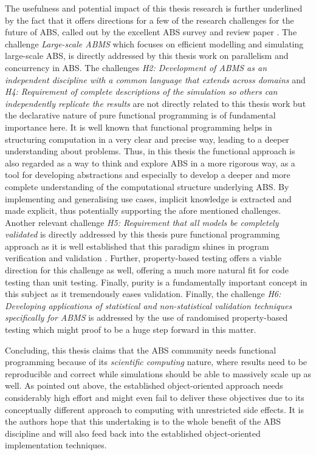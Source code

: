 The usefulness and potential impact of this thesis research is further underlined by the fact that it offers directions for a few of the research challenges for the future of ABS, called out by the excellent ABS survey and review paper \cite{macal_everything_2016}. The challenge \textit{Large-scale ABMS} which focuses on efficient modelling and simulating large-scale ABS, is directly addressed by this thesis work on parallelism and concurrency in ABS. The challenges \emph{H2: Development of ABMS as an independent discipline with a common language that extends across domains} and \emph{H4: Requirement of complete descriptions of the simulation so others can independently replicate the results} are not directly related to this thesis work but the declarative nature of pure functional programming is of fundamental importance here. It is well known that functional programming helps in structuring computation in a very clear and precise way, leading to a deeper understanding about problems. Thus, in this thesis the functional approach is also regarded as a way to think and explore ABS in a more rigorous way, as a tool for developing abstractions and especially to develop a deeper and more complete understanding of the computational structure underlying ABS. By implementing and generalising use cases, implicit knowledge is extracted and made explicit, thus potentially supporting the afore mentioned challenges. Another relevant challenge \emph{H5: Requirement that all models be completely validated} is directly addressed by this thesis pure functional programming approach as it is well established that this paradigm shines in program verification and validation \cite{hudak_history_2007, hutton_tutorial_1999}. Further, property-based testing offers a viable direction for this challenge as well, offering a much more natural fit for code testing than unit testing. Finally, purity is a fundamentally important concept in this subject as it tremendously eases validation. Finally, the challenge \emph{H6: Developing applications of statistical and non-statistical validation techniques specifically for ABMS} is addressed by the use of randomised property-based testing which might proof to be a huge step forward in this matter.

\medskip

Concluding, this thesis claims that the ABS community needs functional programming because of its \textit{scientific computing} nature, where results need to be reproducible and correct while simulations should be able to massively scale up as well. As pointed out above, the established object-oriented approach needs considerably high effort and might even fail to deliver these objectives due to its conceptually different approach to computing with unrestricted side effects. It is the authors hope that this undertaking is to the whole benefit of the ABS discipline and will also feed back into the established object-oriented implementation techniques.


